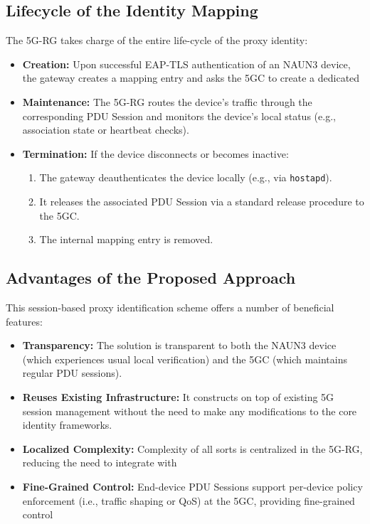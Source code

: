\subsection{Lifecycle of the Identity Mapping}

The \ac{5G-RG} takes charge of the entire life-cycle of the proxy identity:

\begin{itemize}
    \item \textbf{Creation:} Upon successful \ac{EAP-TLS} authentication of an \ac{NAUN3} device, the gateway creates a mapping entry and asks the \ac{5GC} to create a dedicated
    
    \item \textbf{Maintenance:} The \ac{5G-RG} routes the device’s traffic through the corresponding \ac{PDU} Session and monitors the device’s local status (e.g., association state or heartbeat checks).

    \item {
        \textbf{Termination:} If the device disconnects or becomes inactive:
        \begin{enumerate}
            \item The gateway deauthenticates the device locally (e.g., via \texttt{hostapd}).
            \item It releases the associated \ac{PDU} Session via a standard release procedure to the \ac{5GC}.
            \item The internal mapping entry is removed.
        \end{enumerate}
    }
\end{itemize}

\subsection{Advantages of the Proposed Approach}

This session-based proxy identification scheme offers a number of beneficial features:

\begin{itemize}
    \item \textbf{Transparency:} The solution is transparent to both the \ac{NAUN3} device (which experiences usual local verification) and the \ac{5GC} (which maintains regular \ac{PDU} sessions).
    \item \textbf{Reuses Existing Infrastructure:} It constructs on top of existing \ac{5G} session management without the need to make any modifications to the core identity frameworks.

    \item \textbf{Localized Complexity:} Complexity of all sorts is centralized in the \ac{5G-RG}, reducing the need to integrate with
    
    \item \textbf{Fine-Grained Control:} End-device \ac{PDU} Sessions support per-device policy enforcement (i.e., traffic shaping or \ac{QoS}) at the \ac{5GC}, providing fine-grained control
\end{itemize}


